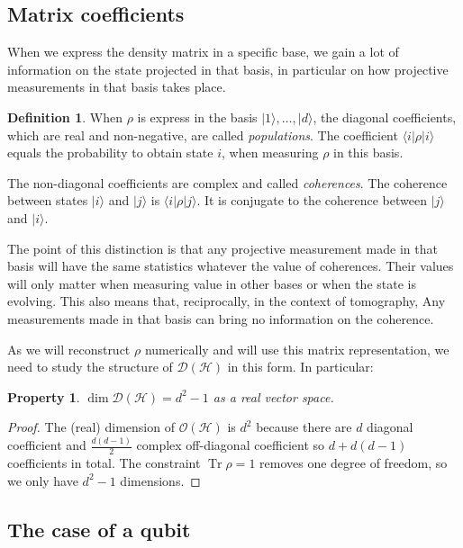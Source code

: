 \documentclass[10pt,a4paper]{report}
\theoremstyle{plain}
\newtheorem{prop}[thm]{Property}
\theoremstyle{definition}
\newtheorem{defn}{Definition}[chapter]
\theoremstyle{remark}
\newcommand{\ket}[1]{|#1\rangle}
\newcommand{\bra}[1]{\langle#1|}
\DeclareMathOperator{\Tr}{Tr}
\begin{document}
\subsection{Matrix coefficients}

When we express the density matrix in a specific base, we gain a lot of
information on the state projected in that basis, in particular on how
projective measurements in that basis takes place.

\begin{defn}
  When $\rho$ is express in the basis $\ket 1, \ldots, \ket d$, the diagonal
  coefficients, which are real and non-negative, are called \emph{populations}. The
  coefficient $\bra i \rho \ket i$ equals the probability to obtain state $i$,
  when measuring $\rho$ in this basis.

  The non-diagonal coefficients are complex and called \emph{coherences}. The
  coherence between states $\ket i$ and $\ket j$ is $\bra i \rho \ket j$. It is conjugate to the coherence between $\ket j$ and $\ket i$.
\end{defn}

The point of this distinction is that any projective measurement made in that
basis will have the same statistics whatever the value of coherences. Their
values will only matter when measuring value in other bases or when the state
is evolving. This also means that, reciprocally, in the context of tomography,
Any measurements made in that basis can bring no information on the coherence.

As we will reconstruct $\rho$ numerically and will use this matrix
representation, we need to study the structure of $\mathcal{D}(\mathcal{H})$ in
this form. In particular:

\begin{prop}
  $\dim \mathcal{D}(\mathcal{H}) = d^2 - 1 $ as a real vector space.
\end{prop}

\begin{proof}
  The (real) dimension of $\mathcal{O}(\mathcal{H})$ is $d^2$ because there are $d$ diagonal
  coefficient and $\frac {d(d-1)} 2$ complex off-diagonal coefficient so $d +
  d(d-1)$ coefficients in total. The constraint $\Tr \rho = 1$ removes one degree
  of freedom, so we only have $d^2 -1$ dimensions.
\end{proof}

\subsection{The case of a qubit}
\end{document}

